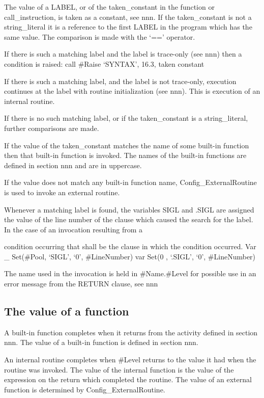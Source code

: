 The value of a LABEL, or of the taken\_constant in the function or
call\_instruction, is taken as a constant, see nnn. If the
taken\_constant is not a string\_literal it is a reference to the first
LABEL in the program which has the same value. The comparison is made
with the `==' operator.

If there is such a matching label and the label is trace-only (see nnn)
then a condition is raised: call \#Raise `SYNTAX', 16.3, taken constant

If there is such a matching label, and the label is not trace-only,
execution continues at the label with routine initialization (see nnn).
This is execution of an internal routine.

If there is no such matching label, or if the taken\_constant is a
string\_literal, further comparisons are made.

If the value of the taken\_constant matches the name of some built-in
function then that built-in function is invoked. The names of the
built-in functions are defined in section nnn and are in uppercase.

If the value does not match any built-in function name,
Config\_ExternalRoutine is used to invoke an external routine.

Whenever a matching label is found, the variables SIGL and .SIGL are
assigned the value of the line number of the clause which caused the
search for the label. In the case of an invocation resulting from a

condition occurring that shall be the clause in which the condition
occurred. Var \_ Set(\#Pool, `SIGL', `0', \#LineNumber) var Set(0 ,
`.SIGL', `0', \#LineNumber)

The name used in the invocation is held in \#Name.\#Level for possible
use in an error message from the RETURN clause, see nnn

\subsection{The value of a function}\label{the-value-of-a-function}

A built-in function completes when it returns from the activity defined
in section nnn. The value of a built-in function is defined in section
nnn.

An internal routine completes when \#Level returns to the value it had
when the routine was invoked. The value of the internal function is the
value of the expression on the return which completed the routine. The
value of an external function is determined by Config\_ExternalRoutine.

